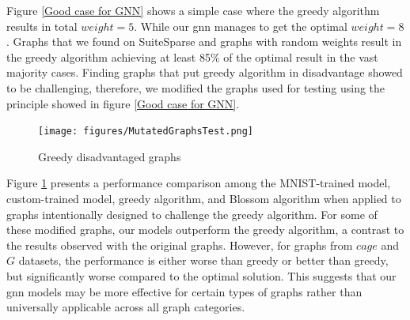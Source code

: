 Figure \ref{Good case for GNN} shows a simple case where the greedy algorithm results in total $weight = 5$. While our \gls{gnn} manages to get the optimal $weight = 8$. Graphs that we found on SuiteSparse and graphs with random weights result in the greedy algorithm achieving at least 85\% of the optimal result in the vast majority cases. Finding graphs that put greedy algorithm in disadvantage showed to be challenging, therefore, we modified the graphs used for testing using the principle showed in figure \ref{Good case for GNN}. 

\begin{figure}[H]
    \centering
    \hspace*{-4.5cm}
    \texttt{[image: figures/MutatedGraphsTest.png]}
    \caption{Greedy disadvantaged graphs}
    \label{Good case benchmark}
\end{figure}

Figure \ref{Good case benchmark} presents a performance comparison among the MNIST-trained model, custom-trained model, greedy algorithm, and Blossom algorithm when applied to graphs intentionally designed to challenge the greedy algorithm. For some of these modified graphs, our models outperform the greedy algorithm, a contrast to the results observed with the original graphs. However, for graphs from $cage$ and $G$ datasets, the performance is either worse than greedy or better than greedy, but significantly worse compared to the optimal solution. This suggests that our \gls{gnn} models may be more effective for certain types of graphs rather than universally applicable across all graph categories.
